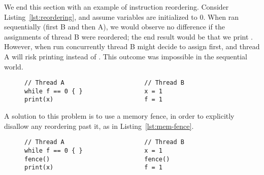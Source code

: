 \documentclass[b5paper]{report}
\begin{document}

We end this section with an example of instruction reordering. Consider
Listing~\ref{lst:reordering}, and assume variables are initialized to 0.  When
ran sequentially (first B and then A), we would observe no difference if the
assignments of thread B were reordered; the end result would be that we print
. However, when run concurrently thread B might decide to assign  first, and thread A will risk printing  instead of . This
outcome was impossible in the sequential world.
\begin{figure}[ht]
\begin{lstlisting}[caption=Instruction reordering,label=lst:reordering]
// Thread A                      // Thread B
while f == 0 { }                 x = 1
print(x)                         f = 1
\end{lstlisting}
\end{figure}

A solution to this problem is to use a memory fence, in order to explicitly
disallow any reordering past it, as in Listing~\ref{lst:mem-fence}.
\begin{figure}[ht]
\begin{lstlisting}[caption=Memory fence for synchronization,label=lst:mem-fence]
// Thread A                      // Thread B
while f == 0 { }                 x = 1
fence()                          fence()
print(x)                         f = 1
\end{lstlisting}
\end{figure}
\end{document}
